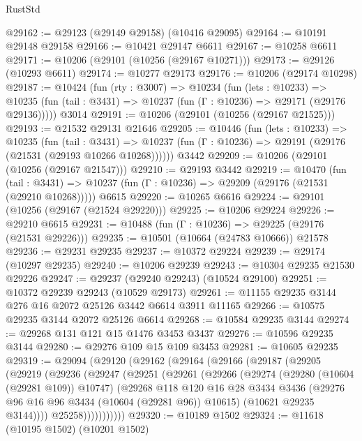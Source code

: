 \begin{lexlean}{RustStd}
\begin{coremodule}
@29162 := @29123 (@29149 @29158) (@10416 @29095)
@29164 := @10191 @29148 @29158
@29166 := @10421 @29147 @6611
@29167 := @10258 @6611
@29171 := @10206 (@29101 (@10256 (@29167 @10271)))
@29173 := @29126 (@10293 @6611)
@29174 := @10277 @29173
@29176 := @10206 (@29174 @10298)
@29187 := @10424
    (fun (rty : @3007) =>
    @10234
      (fun (lets : @10233) =>
      @10235 (fun (tail : @3431) => @10237 (fun (Γ : @10236) => @29171 (@29176 @29136)))))
    @3014
@29191 := @10206 (@29101 (@10256 (@29167 @21525)))
@29193 := @21532 @29131 @21646
@29205 := @10446
    (fun (lets : @10233) =>
    @10235
      (fun (tail : @3431) =>
      @10237 (fun (Γ : @10236) => @29191 (@29176 (@21531 (@29193 @10266 @10268))))))
    @3442
@29209 := @10206 (@29101 (@10256 (@29167 @21547)))
@29210 := @29193 @3442
@29219 := @10470
    (fun (tail : @3431) => @10237 (fun (Γ : @10236) => @29209 (@29176 (@21531 (@29210 @10268)))))
    @6615
@29220 := @10265 @6616
@29224 := @29101 (@10256 (@29167 (@21524 @29220)))
@29225 := @10206 @29224
@29226 := @29210 @6615
@29231 := @10488 (fun (Γ : @10236) => @29225 (@29176 (@21531 @29226)))
@29235 := @10501 (@10664 (@24783 @10666)) @21578
@29236 := @29231 @29235
@29237 := @10372 @29224
@29239 := @29174 (@10297 @29235)
@29240 := @10206 @29239
@29243 := @10304 @29235 @21530 @29226
@29247 := @29237 (@29240 @29243) (@10524 @29100)
@29251 := @10372 @29239 @29243 (@10529 @29173)
@29261 := @11155 @29235 @3144 @276 @16 @2072 @25126 @3442 @6614 @3911 @11165
@29266 := @10575 @29235 @3144 @2072 @25126 @6614
@29268 := @10584 @29235 @3144
@29274 := @29268 @131 @121 @15 @1476 @3453 @3437
@29276 := @10596 @29235 @3144
@29280 := @29276 @109 @15 @109 @3453
@29281 := @10605 @29235
@29319 := @29094
    (@29120
      (@29162
        (@29164
          (@29166
            (@29187
              (@29205
                (@29219
                  (@29236
                    (@29247
                      (@29251
                        (@29261
                          (@29266
                            (@29274
                              (@29280 (@10604 (@29281 @109)) @10747)
                              (@29268
                                @118
                                @120
                                @16
                                @28
                                @3434
                                @3436
                                (@29276 @96 @16 @96 @3434 (@10604 (@29281 @96)) @10615)
                                (@10621 @29235 @3144))))
                          @25258)))))))))))
@29320 := @10189 @1502
@29324 := @11618 (@10195 @1502) (@10201 @1502)

\end{coremodule}
\end{lexlean}
